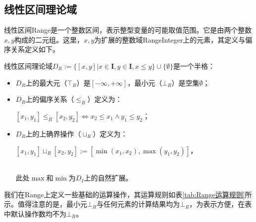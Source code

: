 \subsection{线性区间理论域}
\label{sec:Range}

线性区间Range是一个整数区间，表示整型变量的可能取值范围。它是由两个整数$ x, y $构成的二元组。这里，$ x, y $为扩展的整数域RangeInteger上的元素，其定义与偏序关系定义如下。

\begin{definition}
	线性区间理论域$ D_R :=  \{ [x, y] | x \in \mathbf{I}, y \in \mathbf{I}, x \le y \} \cup \{ \emptyset \}$是一个半格：	
	\begin{itemize}
		\item $ D_R $上的最大元（$ \top_R $）是$ [-\infty, +\infty] $，最小元（$ \bot_R $）是空集$ \emptyset $；
		\item $ D_R $上的偏序关系（$ \le_R $）定义为：\\	
		\centerline{$ [x_1, y_1] \le_R [x_2, y_2] \iff x_2 \le x_1 \land y_1 \le y_2 $；}
		\item $ D_R $上的上确界操作（$ \sqcup_R $）定义为：\\	
		\centerline{$ [x_1, y_1] \sqcup_R [x_2, y_2] := [\min(x_1, x_2), \max(y_1, y_2)] $，}  \\
		此处$ \max $和$ \min $为$ D_I $上的自然扩展。
	\end{itemize}
\end{definition}

我们在Range上定义一些基础的运算操作，其运算规则如表\ref{tab:Range运算规则}所示。值得注意的是，最小元$ \bot_R $与任何元素的计算结果均为$ \bot_R $，为表示方便，在表中默认操作数均不为$ \bot_R $。

